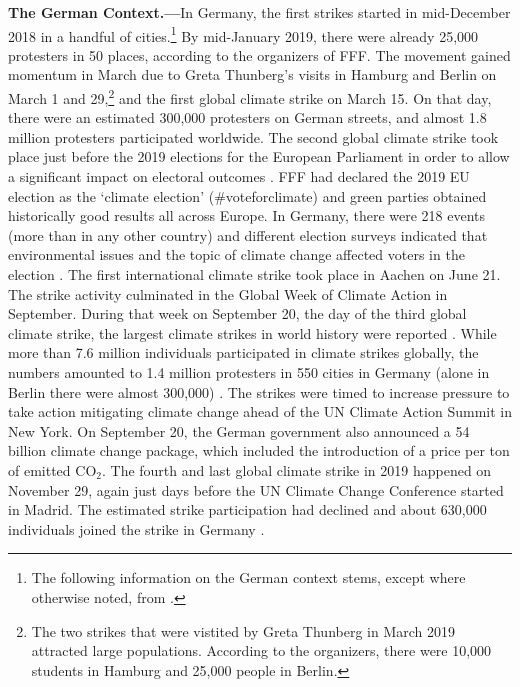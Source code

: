 \textbf{The German Context.---}In Germany, the first strikes started in mid-December 2018 in a handful of cities.\footnote{The following information on the German context stems, except where otherwise noted, from \cite{sommer2019fridays}.} By mid-January 2019, there were already 25,000 protesters in 50 places, according to the organizers of FFF. The movement gained momentum in March due to Greta Thunberg's visits in Hamburg and Berlin on March 1 and 29,\footnote{The two strikes that were vistited by Greta Thunberg in March 2019 attracted large populations. According to the organizers, there were 10,000 students in Hamburg and 25,000 people in Berlin.} and the first global climate strike on March 15. On that day, there were an estimated 300,000 protesters on German streets, and almost 1.8 million protesters participated worldwide. The second global climate strike took place just before the 2019 elections for the European Parliament in order to allow a significant impact on electoral outcomes \citep{smith2019window}. FFF had declared the 2019 EU election as the `climate election' (\#voteforclimate) and green parties obtained historically good results all across Europe. In Germany, there were 218 events (more than in any other country) and different election surveys indicated that environmental issues and the topic of climate change affected voters in the election \citep{Time2019may24}. The first international climate strike took place in Aachen on June 21. The strike activity culminated in the Global Week of Climate Action in September. During that week on September 20, the day of the third global climate strike, the largest climate strikes in world history were reported \citep{guardian2019weekofaction}. While more than 7.6 million individuals participated in climate strikes globally, the numbers amounted to 1.4 million protesters in 550 cities in Germany (alone in Berlin there were almost 300,000) \citep{demoor2020protest}. The strikes were timed to increase pressure to take action mitigating climate change ahead of the UN Climate Action Summit in New York. On September 20, the German government also announced a 54 billion climate change package, which included the introduction of a price per ton of emitted CO$_2$. The fourth and last global climate strike in 2019 happened on November 29, again just days before the UN Climate Change Conference started in Madrid. The estimated strike participation had declined and about 630,000 individuals joined the strike in Germany \citep{zeit20194cgs}. 



